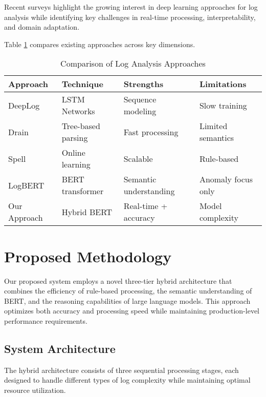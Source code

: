 \documentclass[conference]{IEEEtran}
\begin{document}
Recent surveys \cite{le2021survey} highlight the growing interest in deep learning approaches for log analysis while identifying key challenges in real-time processing, interpretability, and domain adaptation.

Table \ref{tab:related_work} compares existing approaches across key dimensions.

\begin{table}[htbp]
\caption{Comparison of Log Analysis Approaches}
\begin{center}
\begin{tabular}{|p{1.5cm}|p{1.8cm}|p{1.5cm}|p{1.2cm}|}
\hline
\textbf{Approach} & \textbf{Technique} & \textbf{Strengths} & \textbf{Limitations} \\
\hline
DeepLog & LSTM Networks & Sequence modeling & Slow training \\
\hline
Drain & Tree-based parsing & Fast processing & Limited semantics \\
\hline
Spell & Online learning & Scalable & Rule-based \\
\hline
LogBERT & BERT transformer & Semantic understanding & Anomaly focus only \\
\hline
Our Approach & Hybrid BERT & Real-time + accuracy & Model complexity \\
\hline
\end{tabular}
\label{tab:related_work}
\end{center}
\end{table}

\section{Proposed Methodology}

Our proposed system employs a novel three-tier hybrid architecture that combines the efficiency of rule-based processing, the semantic understanding of BERT, and the reasoning capabilities of large language models. This approach optimizes both accuracy and processing speed while maintaining production-level performance requirements.

\subsection{System Architecture}

The hybrid architecture consists of three sequential processing stages, each designed to handle different types of log complexity while maintaining optimal resource utilization.
\end{document}
